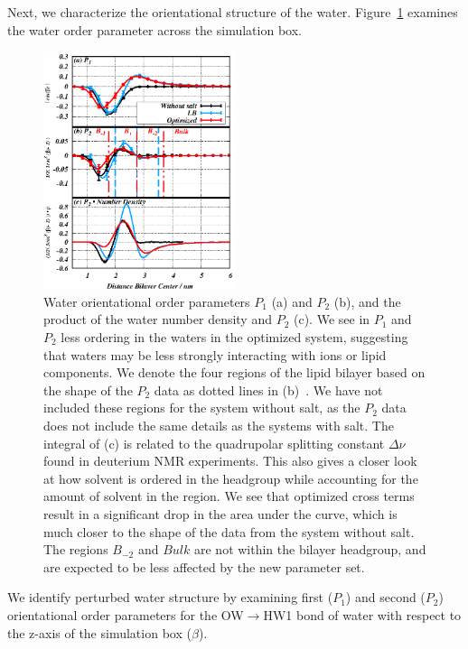 \documentclass[12pt,openany,final]{book}
\begin{document}
Next, we characterize the orientational structure of the water.
Figure~\ref{fig:waterorder} examines the water order parameter across the simulation box. 
\begin{figure}[h!]
    \caption[Water orientational order parameters]{
Water orientational order parameters $P_1$ (a) and $P_2$ (b), 
and the product of the water number density and $P_2$ (c). We see in $P_1$ and $P_2$ less
    ordering in the waters in the optimized system, suggesting that waters may be less strongly interacting with ions or lipid components. We denote the four regions of the lipid bilayer based on the shape of the $P_2$ data as dotted lines
    in (b)~\cite{saunders:2019}. We have not included these regions
 for the system without salt, as the $P_2$ data does not include the same details as the systems with salt. The integral of (c) is related to the
 quadrupolar splitting constant $\Delta \nu$ found in deuterium NMR experiments. This also gives a closer look at how solvent is ordered in the headgroup while
 accounting for the amount of solvent in the region. We see that optimized cross terms result in a significant drop in the area under the curve, which is much closer
 to the shape of the data from the system without salt. 
 The regions $B_{-2}$ and $Bulk$ are not within the bilayer
headgroup, and are expected to be less affected by the new parameter set.}
    \label{fig:waterorder}
    \includegraphics[width=0.5\textwidth,trim=-0cm -0cm 0 0]{figure_7_ch1.eps}
\end{figure}
We identify perturbed water structure by examining first ($P_1$) and second ($P_2$) 
orientational order parameters for the
OW$\rightarrow$HW1 bond of water with respect to the z-axis of the simulation box ($\beta$). 
\end{document}
